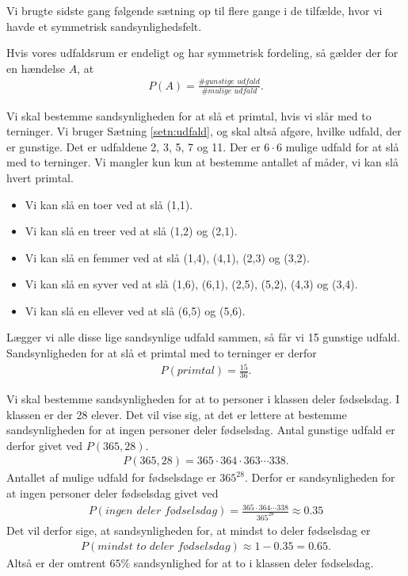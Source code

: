 \documentclass[12pt]{article}
\begin{document}
Vi brugte sidste gang følgende sætning op til flere gange i de tilfælde, hvor vi havde et symmetrisk sandsynlighedsfelt.
\begin{setn}\label{setn:udfald}
Hvis vores udfaldsrum er endeligt og har symmetrisk fordeling, så gælder der for en hændelse $A$, at
\begin{align*}
P(A) = \frac{\# \textit{gunstige udfald}}{\#  \textit{mulige udfald}}.
\end{align*}
\end{setn}
\begin{exa}
Vi skal bestemme sandsynligheden for at slå et primtal, hvis vi slår med to terninger.
Vi bruger Sætning \ref{setn:udfald}, og skal altså afgøre, hvilke udfald, der er gunstige. Det er udfaldene 2, 3, 5, 7 og 11. Der er $6\cdot 6$ mulige udfald for at slå med to terninger. Vi mangler kun kun at bestemme antallet af måder, vi kan slå hvert primtal. 
\begin{itemize}
\item Vi kan slå en toer ved at slå (1,1).
\item Vi kan slå en treer ved at slå (1,2) og (2,1).
\item Vi kan slå en femmer ved at slå (1,4), (4,1), (2,3) og (3,2).
\item Vi kan slå en syver ved at slå (1,6), (6,1), (2,5), (5,2), (4,3) og (3,4).
\item Vi kan slå en ellever ved at slå (6,5) og (5,6).
\end{itemize}
Lægger vi alle disse lige sandsynlige udfald sammen, så får vi 15 gunstige udfald. Sandsynligheden for at slå et primtal med to terninger er derfor 
\begin{align*}
P(\textit{primtal}) = \frac{15}{36}.
\end{align*}
\end{exa}
\begin{exa}

Vi skal bestemme sandsynligheden for at to personer i klassen deler fødselsdag. I klassen er der 28 elever. Det vil vise sig, at det er lettere at bestemme sandsynligheden for at ingen personer deler fødselsdag. Antal gunstige udfald er derfor givet ved $P(365,28)$.
\begin{align*}
P(365,28) = 365\cdot 364\cdot 363 \cdots 338.
\end{align*}
Antallet af mulige udfald for fødselsdage er $365^{28}$. Derfor er sandsynligheden for at ingen personer deler fødselsdag givet ved
\begin{align*}
P(\textit{ingen deler fødselsdag}) = \frac{365\cdot 364 \cdots 338}{365^{28}} \approx 0.35
\end{align*}
Det vil derfor sige, at sandsynligheden for, at mindst to deler fødselsdag er 
\begin{align*}
P(\textit{mindst to deler fødselsdag}) \approx 1-0.35 = 0.65.
\end{align*}
Altså er der omtrent $65\%$ sandsynlighed for at to i klassen deler fødselsdag. 
\end{exa}
\end{document}
